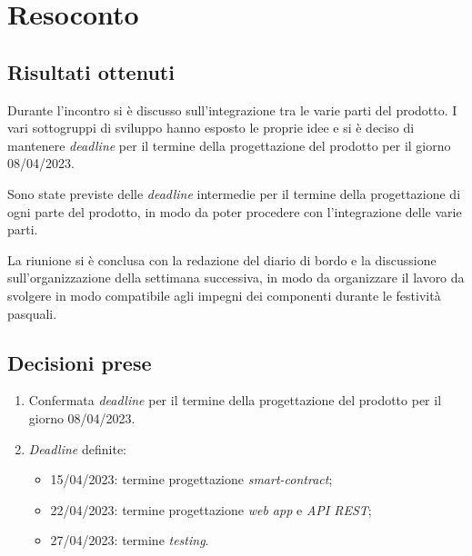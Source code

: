 \section{Resoconto}

\subsection{Risultati ottenuti}

Durante l'incontro si è discusso sull'integrazione tra le varie parti del prodotto. I vari sottogruppi di sviluppo hanno esposto le proprie idee e si è deciso di mantenere \textit{deadline} per il termine della progettazione del prodotto per il giorno 08/04/2023.

Sono state previste delle \textit{deadline} intermedie per il termine della progettazione di ogni parte del prodotto, in modo da poter procedere con l'integrazione delle varie parti.

La riunione si è conclusa con la redazione del diario di bordo e la discussione sull'organizzazione della settimana successiva, in modo da organizzare il lavoro da svolgere in modo compatibile agli impegni dei componenti durante le festività pasquali.



\subsection{Decisioni prese}

\begin{enumerate}

    \item Confermata \textit{deadline} per il termine della progettazione del prodotto per il giorno 08/04/2023.
    \item \textit{Deadline} definite:
    \begin{itemize}
        \item 15/04/2023: termine progettazione \textit{smart-contract};
        \item 22/04/2023: termine progettazione \textit{web app} e \textit{API REST};
        \item 27/04/2023: termine \textit{testing}.
    \end{itemize} 

\end{enumerate}
